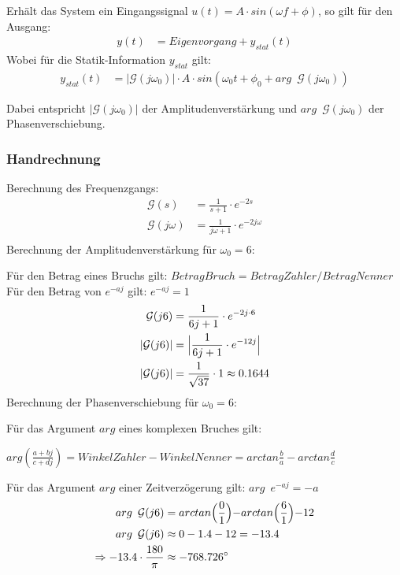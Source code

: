 Erhält das System ein Eingangssignal $u(t) = A \cdot sin(\omega f + \phi)$, so gilt für den Ausgang:
\begin{align*} 
    y(t) &= Eigenvorgang + y_{stat}(t)
\end{align*}
Wobei für die Statik-Information $y_{stat}$ gilt:
\begin{align*}
    y_{stat}(t) &= |\mathcal{G}(j\omega_0)| \cdot A \cdot sin(\omega_0 t+\phi_0 + arg \enspace \mathcal{G}(j\omega_0))
\end{align*}

Dabei entspricht $|\mathcal{G}(j\omega_0)|$ der Amplitudenverstärkung und $arg \enspace \mathcal{G}(j\omega_0)$ der Phasenverschiebung.

\subsubsection{Handrechnung}
Berechnung des Frequenzgangs:
\begin{align*} 
    \mathcal{G}(s) &=  \frac{1}{s+1}\cdot e^{-2s} \\
    \mathcal{G}(j\omega) &=  \frac{1}{j\omega+1} \cdot e^{-2j\omega} \\
\end{align*} 
Berechnung der Amplitudenverstärkung für $ \omega_0 = 6$: 

Für den Betrag eines Bruchs gilt: $BetragBruch = BetragZ\ddot ahler / BetragNenner$ \\
Für den Betrag von $e^{-aj}$ gilt: $e^{-aj} = 1$
\begin{align*} 
    \mathcal{G}(j6) &=  \frac{1}{6j+1} \cdot e^{-2j\cdot 6}\\
    |\mathcal{G}(j6)| &=  \Bigl| \frac{1}{6j+1} \cdot e^{-12j}\Bigr| \\
    |\mathcal{G}(j6)| &=  \frac{1}{\sqrt{37}}\cdot 1 \approx 0.1644 \\
\end{align*} 
Berechnung der Phasenverschiebung für $ \omega_0 = 6$: 

Für das Argument $arg$ eines komplexen Bruches gilt: 

\quad \quad $arg(\frac{a + bj}{c + dj}) = WinkelZ\ddot ahler - WinkelNenner = arctan\frac{b}{a} - arctan\frac{d}{c}$

Für das Argument $arg$ einer Zeitverzögerung gilt: $arg \enspace e^{-aj} = -a$
\begin{align*} 
    arg \enspace \mathcal{G}(j6) &=   arctan \Bigl( \frac{0}{1} \Bigl) - arctan \Bigl( \frac{6}{1} \Bigl) -12  \\
    arg \enspace \mathcal{G}(j6) &\approx  0-1.4-12 = -13.4 \\
             \Rightarrow  -13.4 \cdot \frac{180}{\pi} & \approx -768.726^{\circ}
\end{align*} 


